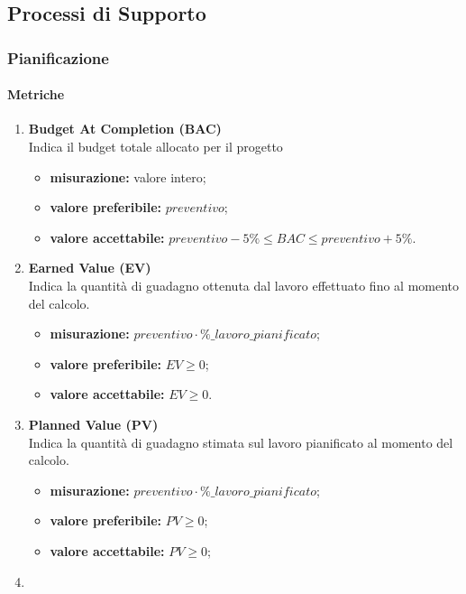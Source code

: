 \subsection{Processi di Supporto}
\subsubsection{Pianificazione}
\paragraph{Metriche}
\begin{enumerate}
	\item[]
	      \textbf{Budget At Completion (BAC)}\\
	      Indica il budget totale allocato per il progetto
	      \begin{itemize}
		      \item \textbf{misurazione:} valore intero;
		      \item \textbf{valore preferibile:} $preventivo$;
		      \item \textbf{valore accettabile:} $preventivo-5\%\leq BAC\leq preventivo+5\%$.
	      \end{itemize}
	\item[]
	      \textbf{Earned Value (EV)}\\
	      Indica la quantità di guadagno ottenuta dal lavoro effettuato fino al momento del calcolo.
	      \begin{itemize}
		      \item \textbf{misurazione:} $preventivo\cdot \%\_lavoro\_pianificato$;
		      \item \textbf{valore preferibile:} $EV\geq 0$;
		      \item \textbf{valore accettabile:} $EV\geq 0$.
	      \end{itemize}
	\item[]
	      \textbf{Planned Value (PV)}\\
	      Indica la quantità di guadagno stimata sul lavoro pianificato al momento del calcolo.
	      \begin{itemize}
		      \item \textbf{misurazione:} $preventivo \cdot \%\_lavoro\_pianificato$;
		      \item \textbf{valore preferibile:} $PV\geq 0$;
		      \item \textbf{valore accettabile:} $PV\geq 0$;
	      \end{itemize}
	\item[]

\end{enumerate}
